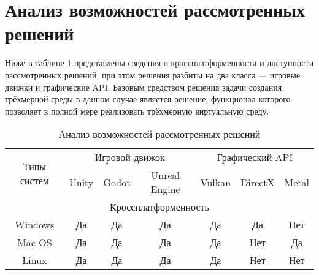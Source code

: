 \section{Анализ возможностей рассмотренных решений}
Ниже в таблице \ref{tab:res_tab} представлены сведения о кроссплатформенности и доступности рассмотренных решений, при этом решения разбиты на два класса --- игровые движки и графические API. Базовым средством решения задачи создания трёхмерной среды в данном случае является решение, функционал которого позволяет в полной мере реализовать трёхмерную виртуальную среду.
\begin{table}[H] 
\captionsetup{justification=raggedright}
\caption{Анализ возможностей рассмотренных решений}
\label{tab:res_tab}
\begin{tabular}{|ccccccc|}
\hline
\multicolumn{1}{|c|}{\multirow{2}{*}{Типы систем}}                                              & \multicolumn{3}{c|}{Игровой движок}                                                          & \multicolumn{3}{c|}{Графический API}                                                  \\ \cline{2-7} 
\multicolumn{1}{|c|}{}                                                                          & \multicolumn{1}{c|}{Unity} & \multicolumn{1}{c|}{Godot} & \multicolumn{1}{c|}{Unreal Engine} & \multicolumn{1}{c|}{Vulkan} & \multicolumn{1}{c|}{DirectX} & Metal                    \\ \hline
\multicolumn{7}{|c|}{Кроссплатформенность}                                                                                                                                                                                                                                             \\ \hline
\multicolumn{1}{|c|}{Windows}                                                                   & \multicolumn{1}{c|}{Да}    & \multicolumn{1}{c|}{Да}    & \multicolumn{1}{c|}{Да}            & \multicolumn{1}{c|}{Да}     & \multicolumn{1}{c|}{Да}      & Нет                      \\ \hline
\multicolumn{1}{|c|}{Mac OS}                                                                    & \multicolumn{1}{c|}{Да}    & \multicolumn{1}{c|}{Да}    & \multicolumn{1}{c|}{Да}            & \multicolumn{1}{c|}{Да}     & \multicolumn{1}{c|}{Нет}     & Да                       \\ \hline
\multicolumn{1}{|c|}{Linux}                                                                     & \multicolumn{1}{c|}{Да}    & \multicolumn{1}{c|}{Да}    & \multicolumn{1}{c|}{Да}            & \multicolumn{1}{c|}{Да}     & \multicolumn{1}{c|}{Нет}     & Нет                      \\ \hline

\end{tabular}
\end{table}
